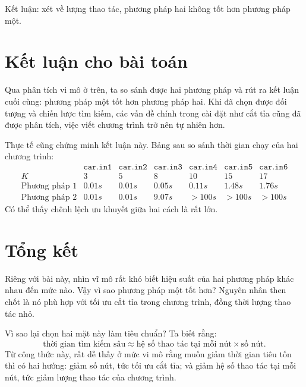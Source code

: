 \documentclass[11pt]{article}
\begin{document}
Kết luận: xét về lượng thao tác, phương pháp hai không tốt hơn phương pháp
một.

\section{Kết luận cho bài toán}

Qua phân tích vi mô ở trên, ta so sánh được hai phương pháp và rút ra kết
luận cuối cùng: phương pháp một tốt hơn phương pháp hai. Khi đã chọn được đối
tượng và chiến lược tìm kiếm, các vấn đề chính trong cài đặt như cắt tỉa cũng
đã được phân tích, việc viết chương trình trở nên tự nhiên hơn.

Thực tế cũng chứng minh kết luận này. Bảng sau so sánh thời gian chạy của hai
chương trình:
\[
\begin{array}{c|cccccc}
& \texttt{car.in1} & \texttt{car.in2} & \texttt{car.in3}
& \texttt{car.in4} & \texttt{car.in5} & \texttt{car.in6}\\
\hline
K & 3 & 5 & 8 & 10 & 15 & 17\\
\text{Phương pháp 1} & 0.01s & 0.01s & 0.05s & 0.11s & 1.48s & 1.76s\\
\text{Phương pháp 2} & 0.01s & 0.01s & 9.07s & >100s & >100s & >100s
\end{array}
\]
Có thể thấy chênh lệch ưu khuyết giữa hai cách là rất lớn.

\section{Tổng kết}

Riêng với bài này, nhìn vĩ mô rất khó biết hiệu suất của hai phương pháp khác
nhau đến mức nào. Vậy vì sao phương pháp một tốt hơn? Nguyên nhân then chốt là
nó phù hợp với tối ưu cắt tỉa trong chương trình, đồng thời lượng thao tác
nhỏ.

Vì sao lại chọn hai mặt này làm tiêu chuẩn? Ta biết rằng:
\[
  \text{thời gian tìm kiếm sâu}
  \approx
  \text{hệ số thao tác tại mỗi nút}
  \times
  \text{số nút}.
\]
Từ công thức này, rất dễ thấy ở mức vi mô rằng muốn giảm thời gian tiêu tốn
thì có hai hướng: giảm số nút, tức tối ưu cắt tỉa; và giảm hệ số thao tác tại
mỗi nút, tức giảm lượng thao tác của chương trình.
\end{document}
